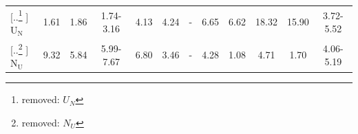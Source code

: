 \documentclass[preprint, 12pt]{elsarticle}
\providecommand{\DIFaddtex}[1]{{\protect\color{blue} \sf #1}} %
\providecommand{\DIFdeltex}[1]{{\protect\color{red} [..\footnote{removed: #1} ]}} %
\providecommand{\DIFaddFL}[1]{\DIFadd{#1}} %
\providecommand{\DIFdelFL}[1]{\DIFdel{#1}} %
\providecommand{\DIFaddbeginFL}{} %
\providecommand{\DIFaddendFL}{} %
\providecommand{\DIFdelbeginFL}{} %
\providecommand{\DIFdelendFL}{} %
\providecommand{\DIFadd}[1]{\texorpdfstring{\DIFaddtex{#1}}{#1}} %
\providecommand{\DIFdel}[1]{\texorpdfstring{\DIFdeltex{#1}}{}} %
\newcommand{\DIFscaledelfig}{0.5}
\newlength{\DIFdelgraphicswidth} %
\newlength{\DIFdelgraphicsheight} %
\newcommand{\DIFaddincludegraphics}[2][]{{\color{blue}\fbox{\DIFOincludegraphics[#1]{#2}}}} %
\newcommand{\DIFdelincludegraphics}[2][]{%
\sbox{\DIFdelgraphicsbox}{\DIFOincludegraphics[#1]{#2}}%
\settoboxwidth{\DIFdelgraphicswidth}{\DIFdelgraphicsbox} %
\settoboxtotalheight{\DIFdelgraphicsheight}{\DIFdelgraphicsbox} %
\scalebox{\DIFscaledelfig}{%
\parbox[b]{\DIFdelgraphicswidth}{\usebox{\DIFdelgraphicsbox}\\[-\baselineskip] \rule{\DIFdelgraphicswidth}{0em}}\llap{\resizebox{\DIFdelgraphicswidth}{\DIFdelgraphicsheight}{%
\setlength{\unitlength}{\DIFdelgraphicswidth}%
\begin{picture}(1,1)%
\thicklines\linethickness{2pt} %
{\color[rgb]{1,0,0}\put(0,0){\framebox(1,1){}}}%
{\color[rgb]{1,0,0}\put(0,0){\line( 1,1){1}}}%
{\color[rgb]{1,0,0}\put(0,1){\line(1,-1){1}}}%
\end{picture}%
}\hspace*{3pt}}} %
} %
\DeclareRobustCommand{\DIFaddbeginFL}{\DIFOaddbeginFL \let\includegraphics\DIFaddincludegraphics} %
\DeclareRobustCommand{\DIFaddendFL}{\DIFOaddendFL \let\includegraphics\DIFOincludegraphics} %
\DeclareRobustCommand{\DIFdelbeginFL}{\DIFOdelbeginFL \let\includegraphics\DIFdelincludegraphics} %
\DeclareRobustCommand{\DIFdelendFL}{\DIFOaddendFL \let\includegraphics\DIFOincludegraphics} %
\begin{document}
\begin{table}[h!]
\begin{tabular}{l|cc|c|cc|c|cc|cc|c}
\DIFdelbeginFL \DIFdelFL{$U_N$ }\DIFdelendFL \DIFaddbeginFL \DIFaddFL{U$_\text{N}$ }\DIFaddendFL & 1.61            & 1.86            & 1.74-3.16 \cite{Kocevski2022I}                             & 4.13            & 4.24            & -                         & 6.65            & 6.62            & 18.32            & 15.90 & 3.72-5.52  \cite{Kocevski2022I} \\
\DIFdelbeginFL \DIFdelFL{$N_U$ }\DIFdelendFL \DIFaddbeginFL \DIFaddFL{N$_\text{U}$ }\DIFaddendFL & 9.32            & 5.84            & 5.99-7.67 \cite{Kocevski2022I}                             & 6.80            & 3.46            & -                         & 4.28            & 1.08            & 4.71             & 1.70  & 4.06-5.19  \cite{Kocevski2022I} \\
\hline
\end{tabular}
\label{Tab:Ef}
\end{table}
\end{document}
